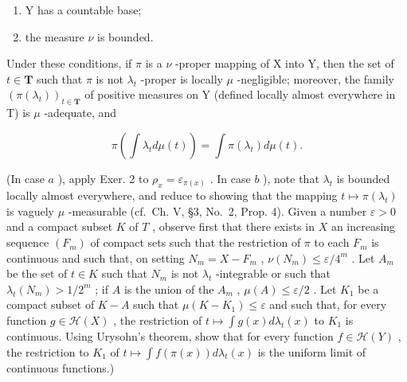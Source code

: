 \begin{enumerate}
\def\labelenumi{\alph{enumi})}
\item
  Y has a countable base;
\item
  the measure \(\nu\) is bounded.
\end{enumerate}

Under these conditions, if \(\pi\) is a \(\nu\) -proper mapping of X into Y, then the set of \(t \in \mathbf{T}\) such that \(\pi\) is not \(\lambda_t\) -proper is locally \(\mu\) -negligible; moreover, the family \((\pi(\lambda_t))_{t \in \mathbf{T}}\) of positive measures on Y (defined locally almost everywhere in T) is \(\mu\) -adequate, and

\[
\pi \left(\int \lambda_ {t} d \mu (t)\right) = \int \pi (\lambda_ {t}) d \mu (t).
\]

(In case \(a\) ), apply Exer. 2 to \(\rho_x = \varepsilon_{\pi(x)}\) . In case \(b\) ), note that \(\lambda_t\) is bounded locally almost everywhere, and reduce to showing that the mapping \(t \mapsto \pi(\lambda_t)\) is vaguely \(\mu\) -measurable (cf.~Ch. V, §3, No.~2, Prop. 4). Given a number \(\varepsilon > 0\) and a compact subset \(K\) of \(T\) , observe first that there exists in \(X\) an increasing sequence \((F_m)\) of compact sets such that the restriction of \(\pi\) to each \(F_m\) is continuous and such that, on setting \(N_m = X - F_m\) , \(\nu(N_m) \leqslant \varepsilon/4^m\) . Let \(A_m\) be the set of \(t \in K\) such that \(N_m\) is not \(\lambda_t\) -integrable or such that \(\lambda_t(N_m) > 1/2^m\) ; if \(A\) is the union of the \(A_m\) , \(\mu(A) \leqslant \varepsilon/2\) . Let \(K_1\) be a compact subset of \(K - A\) such that \(\mu(K - K_1) \leqslant \varepsilon\) and such that, for every function \(g \in \mathcal{H}(X)\) , the restriction of \(t \mapsto \int g(x) d\lambda_t(x)\) to \(K_1\) is continuous. Using Urysohn's theorem, show that for every function \(f \in \mathcal{H}(Y)\) , the restriction to \(K_1\) of \(t \mapsto \int f(\pi(x)) d\lambda_t(x)\) is the uniform limit of continuous functions.)

